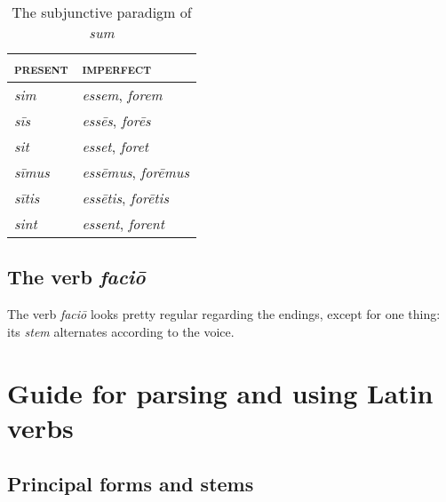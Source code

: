 \documentclass[a4paper, oneside]{report}
\newcommand{\form}[1]{\emph{#1}}
\newcommand*{\category}[1]{\textsc{#1}}
\begin{document}
\begin{table}[H]
    \caption{The subjunctive paradigm of \form{sum}}
    \centering
    \label{tbl:subjunctive-sum}
    \begin{tabular}{ll}
    \toprule
    \category{present}   & \category{imperfect}   \\ \midrule
    \form{sim}       & \form{essem}, \form{forem}       \\
    \form{sīs}   & \form{ess\={e}s}, \form{for\={e}s}   \\
    \form{sit}       & \form{esset}, \form{foret}       \\
    \form{sīmus} & \form{ess\={e}mus}, \form{for\={e}mus} \\
    \form{sītis} & \form{ess\={e}tis}, \form{for\={e}tis} \\
    \form{sint}      & \form{essent}, \form{forent}     \\ \bottomrule
    \end{tabular}
\end{table}

\subsection{The verb \form{faci\={o}}}

The verb \form{faci\={o}} looks pretty regular
regarding the endings, 
except for one thing: 
its \emph{stem} alternates according to the voice.

\section{Guide for parsing and using Latin verbs}\label{sec:verb-inflection.parsing}

\subsection{Principal forms and stems}\label{sec:verb-inflection.parsing.principal-part}
\end{document}
